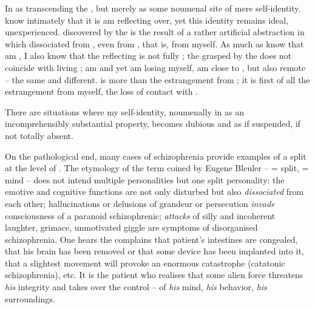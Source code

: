 
In     as transcending the
, but merely as some noumenal site of mere
self-identity.  know intimately that it is   am
reflecting over, yet this identity remains ideal, unexperienced.  
discovered by the  is the result of a rather artificial
abstraction in which  dissociated  from , even from , that is, from myself.  As much as  know
that  am , I also know that the reflecting  is not fully
; the  grasped by the  does not coincide
with  living ;  am  and yet  am
losing myself,  am close to , but also remote -- the same and
different.  is more than the estrangement from ; it
is first of all the estrangement from myself, the loss of contact with .

\pa There are situations where my self-identity,  noumenally in
 as an incomprehensibly substantial property, becomes
dubious and as if suspended, if not totally absent.

On the pathological end, many cases of schizophrenia provide examples of a split
at the level of . The etymology of the term
coined by Eugene Bleuler --  = split,  = mind -- does not
intend multiple personalities but one split personality: the emotive and
cognitive functions are not only disturbed but also {\em dissociated} from each
other; hallucinations or delusions of grandeur or persecution {\em invade}
consciousness of a paranoid schizophrenic; {\em attacks} of silly and incoherent
laughter, grimace, unmotivated giggle are symptoms of disorganised
schizophrenia.  One hears the complains that patient's intestines are congealed,
that his brain has been removed or that some device has been implanted into it,
that a slightest movement will provoke an enormous catastrophe (catatonic
schizophrenia), etc.
It is the  patient who realises that some alien force threatens {\em his} integrity
and takes over the control -- of {\em his} mind, {\em his} behavior, {\em his}
surroundings.  

